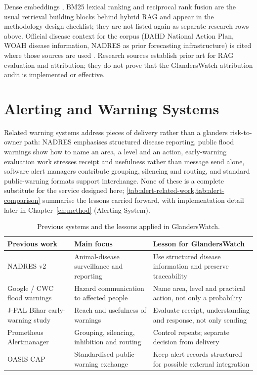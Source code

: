 \documentclass[10pt,openany]{report}
\begin{document}
Dense embeddings \cite{reimers2019}, BM25 lexical ranking \cite{robertson2009} and reciprocal rank
fusion \cite{cormack2009} are the usual retrieval building blocks behind hybrid RAG and appear in the
methodology design checklist; they are not listed again as separate research rows above. Official
disease context for the corpus (DAHD National Action Plan, WOAH disease information, NADRES as prior
forecasting infrastructure) is cited where those sources are used
\cite{dahd2025,wahis,nadres}. Research sources establish prior art for RAG evaluation and attribution;
they do not prove that the GlandersWatch attribution audit is implemented or effective.

\section{Alerting and Warning Systems}

Related warning systems address pieces of delivery rather than a glanders risk-to-owner path: NADRES
emphasises structured disease reporting, public flood warnings show how to name an area, a level and
an action, early-warning evaluation work stresses receipt and usefulness rather than message send
alone, software alert managers contribute grouping, silencing and routing, and standard public-warning
formats support interchange. None of these is a complete substitute for the service designed here;
\cref{tab:alert-related-work,tab:alert-comparison} summarise the lessons carried
forward, with implementation detail later in Chapter~\ref{ch:method} (Alerting System).

\begin{table}[htbp]\centering\small
\caption{Previous systems and the lessons applied in GlandersWatch.}\label{tab:alert-related-work}
\begin{tabular}{@{}>{\raggedright\arraybackslash}p{2.7cm}
                >{\raggedright\arraybackslash}p{4.6cm}
                >{\raggedright\arraybackslash}p{5.0cm}@{}}
\toprule
\textbf{Previous work} & \textbf{Main focus} & \textbf{Lesson for GlandersWatch} \\
\midrule
NADRES v2 & Animal-disease surveillance and reporting & Use structured disease information and preserve traceability \\
Google / CWC flood warnings & Hazard communication to affected people & Name area, level and practical action, not only a probability \\
J-PAL Bihar early-warning study & Reach and usefulness of warnings & Evaluate receipt, understanding and response, not only sending \\
Prometheus Alertmanager & Grouping, silencing, inhibition and routing & Control repeats; separate decision from delivery \\
OASIS CAP & Standardised public-warning exchange & Keep alert records structured for possible external integration \\
\bottomrule
\end{tabular}
\end{table}
\end{document}
